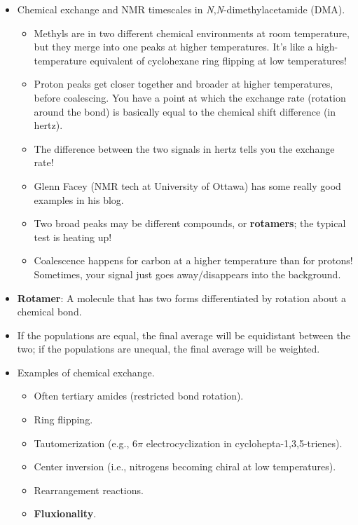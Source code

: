 \documentclass[../notes.tex]{subfiles}
\begin{document}
\begin{itemize}
\begin{itemize}
    \end{itemize}
    \item Chemical exchange and NMR timescales in \emph{N},\emph{N}-dimethylacetamide (DMA).
    \begin{itemize}
        \item Methyls are in two different chemical environments at room temperature, but they merge into one peaks at higher temperatures. It's like a high-temperature equivalent of cyclohexane ring flipping at low temperatures!
        \item Proton peaks get closer together and broader at higher temperatures, before coalescing. You have a point at which the exchange rate (rotation around the bond) is basically equal to the chemical shift difference (in hertz).
        \item The difference between the two signals in hertz tells you the exchange rate!
        \item Glenn Facey (NMR tech at University of Ottawa) has some really good examples in his blog.
        \item Two broad peaks may be different compounds, or \textbf{rotamers}; the typical test is heating up!
        \item Coalescence happens for carbon at a higher temperature than for protons! Sometimes, your signal just goes away/disappears into the background.
    \end{itemize}
    \item \textbf{Rotamer}: A molecule that has two forms differentiated by rotation about a chemical bond.
    \item If the populations are equal, the final average will be equidistant between the two; if the populations are unequal, the final average will be weighted.
    \item Examples of chemical exchange.
    \begin{itemize}
        \item Often tertiary amides (restricted bond rotation).
        \item Ring flipping.
        \item Tautomerization (e.g., $6\pi$ electrocyclization in cyclohepta-1,3,5-trienes).
        \item Center inversion (i.e., nitrogens becoming chiral at low temperatures).
        \item Rearrangement reactions.
        \item \textbf{Fluxionality}.
    \end{itemize}

\end{itemize}
\end{document}
